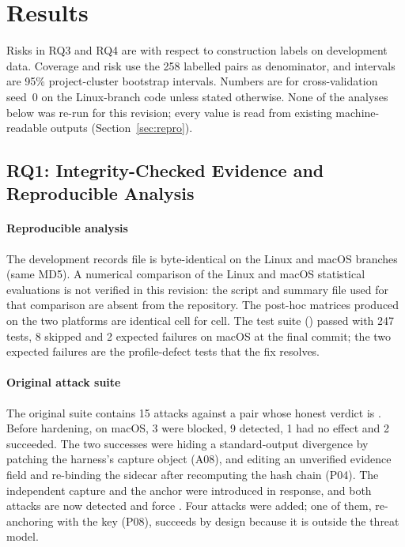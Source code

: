 \section{Results}\label{sec:results}

Risks in RQ3 and RQ4 are with respect to construction labels on development data. Coverage and risk use the 258 labelled pairs as denominator, and intervals are 95\% project-cluster bootstrap intervals. Numbers are for cross-validation seed~0 on the Linux-branch code unless stated otherwise. None of the analyses below was re-run for this revision; every value is read from existing machine-readable outputs (Section~\ref{sec:repro}).

\subsection{RQ1: Integrity-Checked Evidence and Reproducible Analysis}\label{sec:res-rq1}
\paragraph*{Reproducible analysis} The development records file is byte-identical on the Linux and macOS branches (same MD5). A numerical comparison of the Linux and macOS statistical evaluations is not verified in this revision: the script and summary file used for that comparison are absent from the repository. The post-hoc \ers{} matrices produced on the two platforms are identical cell for cell. The \sbg{} test suite () passed with 247 tests, 8 skipped and 2 expected failures on macOS at the final commit; the two expected failures are the profile-defect tests that the fix resolves.

\paragraph*{Original attack suite} The original suite contains 15 attacks against a pair whose honest verdict is \DIV{}. Before hardening, on macOS, 3 were blocked, 9 detected, 1 had no effect and 2 succeeded. The two successes were hiding a standard-output divergence by patching the harness's capture object (A08), and editing an unverified evidence field and re-binding the sidecar after recomputing the hash chain (P04). The independent capture and the anchor were introduced in response, and both attacks are now detected and force \INS{}. Four attacks were added; one of them, re-anchoring with the key (P08), succeeds by design because it is outside the threat model.

